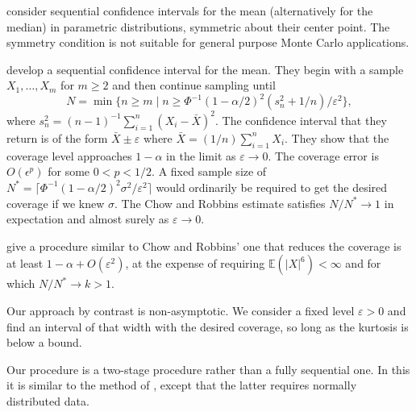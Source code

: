\documentclass{article}
\newcommand{\e}{\mathbb{E}}
\begin{document}
\cite{serf:wack:1976}
consider sequential confidence intervals
for the mean (alternatively for the median)
in parametric distributions, symmetric
about their center point.  The symmetry
condition is not suitable for general
purpose Monte Carlo applications.

\cite{chow:robb:1965} develop a sequential
confidence interval for the mean.
They begin with a sample $X_1,\dots,X_m$ for $m\ge 2$
and then continue sampling until
$$N = \min\{ n\ge m \mid n\ge 
\Phi^{-1}(1-\alpha/2)^2(s_n^2+1/n)/\varepsilon^2\},$$
where $s_n^2 = (n-1)^{-1}\sum_{i=1}^n(X_i-\bar X)^2$.
The confidence interval that they return is of
the form $\bar X \pm \varepsilon$
where $\bar X = (1/n)\sum_{i=1}^nX_i$.
They show that the coverage level approaches
$1-\alpha$ in the limit as $\varepsilon\to 0$.
The coverage error is $O(\epsilon^p)$ for
some $0<p<1/2$. A fixed sample size of
$N^* = \lceil \Phi^{-1}(1-\alpha/2)^2\sigma^2/\varepsilon^2\rceil$
would ordinarily be required to get the desired 
coverage if we knew $\sigma$.
The Chow and Robbins estimate satisfies $N/N^*\to 1$
in expectation and almost surely as $\varepsilon\to 0$.

\cite{mukh:datt:1996} give a procedure similar
to Chow and Robbins' one that
reduces the coverage is at least $1-\alpha+O(\varepsilon^2)$,
at the expense of requiring $\e(|X|^6)<\infty$
and for which $N/N^*\to k>1$.

Our approach by contrast is non-asymptotic. We
consider a fixed level $\varepsilon>0$ and
find an interval of that width with the
desired coverage, so long as the kurtosis is
below a bound.

Our procedure is a two-stage procedure
rather than a fully sequential one.  In
this it is similar to the method of
\cite{stei:1945,stei:1949}, except that
the latter requires normally distributed
data.




\end{document}
